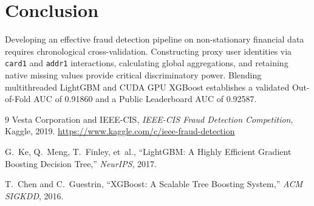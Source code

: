 \documentclass[10pt,twocolumn,a4paper]{article}
\begin{document}
\section{Conclusion}
Developing an effective fraud detection pipeline on non-stationary financial data requires chronological cross-validation. Constructing proxy user identities via \texttt{card1} and \texttt{addr1} interactions, calculating global aggregations, and retaining native missing values provide critical discriminatory power. Blending multithreaded LightGBM and CUDA GPU XGBoost establishes a validated Out-of-Fold AUC of 0.91860 and a Public Leaderboard AUC of 0.92587.

\begin{thebibliography}{9}
Vesta Corporation and IEEE-CIS,
\emph{IEEE-CIS Fraud Detection Competition},
Kaggle, 2019. \url{https://www.kaggle.com/c/ieee-fraud-detection}

G.~Ke, Q.~Meng, T.~Finley, et~al.,
``LightGBM: A Highly Efficient Gradient Boosting Decision Tree,''
\emph{NeurIPS}, 2017.

T.~Chen and C.~Guestrin,
``XGBoost: A Scalable Tree Boosting System,''
\emph{ACM SIGKDD}, 2016.
\end{thebibliography}
\end{document}

